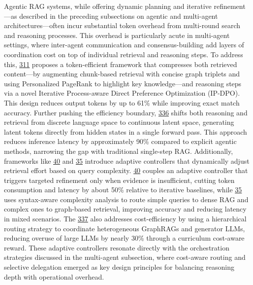 \documentclass[11pt]{article}
\begin{document}
Agentic RAG systems, while offering dynamic planning and iterative refinement---as described in the preceding subsections on agentic and multi-agent architectures---often incur substantial token overhead from multi-round search and reasoning processes. This overhead is particularly acute in multi-agent settings, where inter-agent communication and consensus-building add layers of coordination cost on top of individual retrieval and reasoning steps. To address this, \href{TeaRAG\%20A\%20Token-Efficient\%20Agentic\%20Retrieval-Augmented\%20Generation\%20Framework}{311} proposes a token-efficient framework that compresses both retrieved content---by augmenting chunk-based retrieval with concise graph triplets and using Personalized PageRank to highlight key knowledge---and reasoning steps via a novel Iterative Process-aware Direct Preference Optimization (IP-DPO). This design reduces output tokens by up to 61\% while improving exact match accuracy. Further pushing the efficiency boundary, \href{LatentRAG\%20Latent\%20Reasoning\%20and\%20Retrieval\%20for\%20Efficient\%20Agentic\%20RAG}{336} shifts both reasoning and retrieval from discrete language space to continuous latent space, generating latent tokens directly from hidden states in a single forward pass. This approach reduces inference latency by approximately 90\% compared to explicit agentic methods, narrowing the gap with traditional single-step RAG. Additionally, frameworks like \href{A2RAG\%20Adaptive\%20Agentic\%20Graph\%20Retrieval\%20for\%20Cost-Aware\%20and\%20Reliable\%20Reasoning}{40} and \href{Use\%20Graph\%20When\%20It\%20Needs\%20Efficiently\%20and\%20Adaptively\%20Integrating\%20Retrieval-Augmented\%20Generation\%20with\%20Graphs}{35} introduce adaptive controllers that dynamically adjust retrieval effort based on query complexity. \href{A2RAG\%20Adaptive\%20Agentic\%20Graph\%20Retrieval\%20for\%20Cost-Aware\%20and\%20Reliable\%20Reasoning}{40} couples an adaptive controller that triggers targeted refinement only when evidence is insufficient, cutting token consumption and latency by about 50\% relative to iterative baselines, while \href{Use\%20Graph\%20When\%20It\%20Needs\%20Efficiently\%20and\%20Adaptively\%20Integrating\%20Retrieval-Augmented\%20Generation\%20with\%20Graphs}{35} uses syntax-aware complexity analysis to route simple queries to dense RAG and complex ones to graph-based retrieval, improving accuracy and reducing latency in mixed scenarios. The \href{GraphRAG-Router\%20Learning\%20Cost-Efficient\%20Routing\%20over\%20GraphRAGs\%20and\%20LLMs\%20with\%20Reinforcement\%20Learning}{337} also addresses cost-efficiency by using a hierarchical routing strategy to coordinate heterogeneous GraphRAGs and generator LLMs, reducing overuse of large LLMs by nearly 30\% through a curriculum cost-aware reward. These adaptive controllers resonate directly with the orchestration strategies discussed in the multi-agent subsection, where cost-aware routing and selective delegation emerged as key design principles for balancing reasoning depth with operational overhead.
\end{document}
